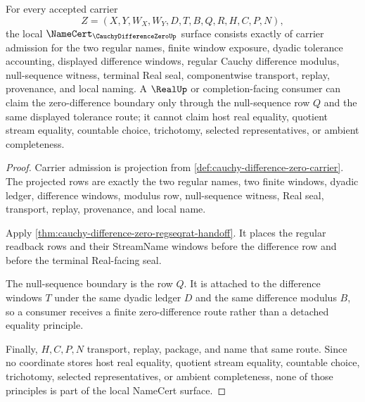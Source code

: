 \begin{theorem}
\label{thm:cauchy-difference-zero-null-sequence-boundary}
For every accepted carrier
$$
Z=(X,Y,W_X,W_Y,D,T,B,Q,R,H,C,P,N),
$$
the local $\NameCert_{\CauchyDifferenceZeroUp}$ surface consists exactly of carrier admission for the two regular names, finite window exposure, dyadic tolerance accounting, displayed difference windows, regular Cauchy difference modulus, null-sequence witness, terminal Real seal, componentwise transport, replay, provenance, and local naming. A $\RealUp$ or completion-facing consumer can claim the zero-difference boundary only through the null-sequence row $Q$ and the same displayed tolerance route; it cannot claim host real equality, quotient stream equality, countable choice, trichotomy, selected representatives, or ambient completeness.
\end{theorem}
\begin{proof}
Carrier admission is projection from \autoref{def:cauchy-difference-zero-carrier}. The projected rows are exactly the two regular names, two finite windows, dyadic ledger, difference windows, modulus row, null-sequence witness, Real seal, transport, replay, provenance, and local name.

Apply \autoref{thm:cauchy-difference-zero-regseqrat-handoff}. It places the regular readback rows and their StreamName windows before the difference row and before the terminal Real-facing seal.

The null-sequence boundary is the row $Q$. It is attached to the difference windows $T$ under the same dyadic ledger $D$ and the same difference modulus $B$, so a consumer receives a finite zero-difference route rather than a detached equality principle.

Finally, $H,C,P,N$ transport, replay, package, and name that same route. Since no coordinate stores host real equality, quotient stream equality, countable choice, trichotomy, selected representatives, or ambient completeness, none of those principles is part of the local NameCert surface.
\end{proof}


